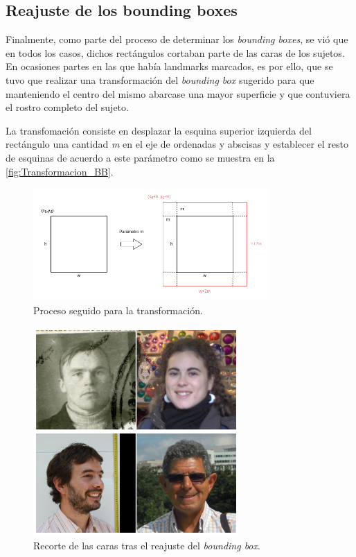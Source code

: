         \subsection{Reajuste de los bounding boxes}
            \noindent Finalmente, como parte del proceso de determinar los \textit{bounding boxes}, se vió que en todos los casos, dichos rectángulos cortaban parte de las caras de los sujetos. En ocasiones partes en las que había landmarks marcados, es por ello, que se tuvo que realizar una transformación del \textit{bounding box} sugerido para que manteniendo el centro del mismo abarcase una mayor superficie y que contuviera el rostro completo del sujeto. 

            \medskip

            \noindent La transfomación consiste en desplazar la esquina superior izquierda del rectángulo una cantidad \textit{m} en el eje de ordenadas y abscisas y establecer el resto de esquinas de acuerdo a este parámetro como se muestra en la \autoref{fig:Transformacion_BB}.


            \begin{figure}[H]
                \centering
                \includegraphics[width=0.8\textwidth]{img/Transformacion_rectangulo.png}
                \caption{Proceso seguido para la transformación.}
                \label{fig:Transformacion_BB}
            \end{figure}

            \begin{figure}[H]
                \centering
                \includegraphics[width=0.7\textwidth]{img/imagenes_ejemplo_cropping.png}
                \caption{Recorte de las caras tras el reajuste del \textit{bounding box}.}
                \label{fig:Reajuste_bb}
            \end{figure}



